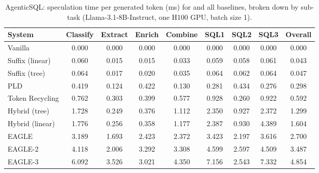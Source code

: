 \begin{table}[htbp]
\centering
\caption{AgenticSQL: speculation time per generated token (ms) for \SuffixDecoding and all baselines, broken down by sub-task (Llama-3.1-8B-Instruct, one H100 GPU, batch size 1).}
\label{suffixdecoding:tab:sql-spectime}
\small
\begin{adjustbox}{width=\linewidth}
\begin{tabular}{lcccccccc}
\toprule
\textbf{System} & Classify & Extract & Enrich & Combine & SQL1 & SQL2 & SQL3 & \textbf{Overall} \\
\midrule
Vanilla & 0.000 & 0.000 & 0.000 & 0.000 & 0.000 & 0.000 & 0.000 & 0.000 \\
Suffix (linear) & 0.060 & 0.015 & 0.015 & 0.033 & 0.059 & 0.058 & 0.061 & 0.043 \\
Suffix (tree) & 0.064 & 0.017 & 0.020 & 0.035 & 0.064 & 0.062 & 0.064 & 0.047 \\
PLD & 0.419 & 0.124 & 0.422 & 0.130 & 0.281 & 0.434 & 0.276 & 0.298 \\
Token Recycling & 0.762 & 0.303 & 0.399 & 0.577 & 0.928 & 0.260 & 0.922 & 0.592 \\
Hybrid (tree) & 1.728 & 0.249 & 0.376 & 1.112 & 2.350 & 0.927 & 2.372 & 1.299 \\
Hybrid (linear) & 1.776 & 0.256 & 0.358 & 1.177 & 2.387 & 0.930 & 4.389 & 1.604 \\
EAGLE & 3.189 & 1.693 & 2.423 & 2.372 & 3.423 & 2.197 & 3.616 & 2.700 \\
EAGLE-2 & 4.118 & 2.006 & 3.292 & 3.308 & 4.599 & 2.597 & 4.509 & 3.487 \\
EAGLE-3 & 6.092 & 3.526 & 3.021 & 4.350 & 7.156 & 2.543 & 7.332 & 4.854 \\
\bottomrule
\end{tabular}
\end{adjustbox}
\end{table}


